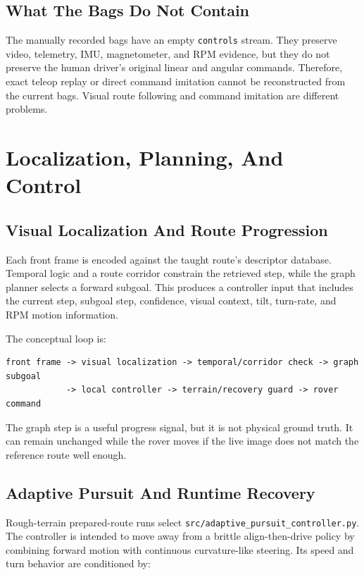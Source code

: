 \documentclass[11pt]{article}
\begin{document}
\subsection{What The Bags Do Not Contain}

The manually recorded bags have an empty \texttt{controls} stream. They preserve
video, telemetry, IMU, magnetometer, and RPM evidence, but they do not preserve
the human driver's original linear and angular commands. Therefore, exact teleop
replay or direct command imitation cannot be reconstructed from the current
bags. Visual route following and command imitation are different problems.

\section{Localization, Planning, And Control}

\subsection{Visual Localization And Route Progression}

Each front frame is encoded against the taught route's descriptor database.
Temporal logic and a route corridor constrain the retrieved step, while the graph
planner selects a forward subgoal. This produces a controller input that includes
the current step, subgoal step, confidence, visual context, tilt, turn-rate, and
RPM motion information.

The conceptual loop is:

\begin{lstlisting}
front frame -> visual localization -> temporal/corridor check -> graph subgoal
            -> local controller -> terrain/recovery guard -> rover command
\end{lstlisting}

The graph step is a useful progress signal, but it is not physical ground truth.
It can remain unchanged while the rover moves if the live image does not match
the reference route well enough.

\subsection{Adaptive Pursuit And Runtime Recovery}

Rough-terrain prepared-route runs select
\texttt{src/adaptive\_pursuit\_controller.py}. The controller is intended to
move away from a brittle align-then-drive policy by combining forward motion with
continuous curvature-like steering. Its speed and turn behavior are conditioned
by:
\end{document}
